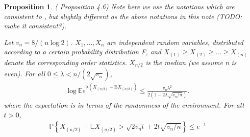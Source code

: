 \documentclass{article}
\theoremstyle{plain}
\newtheorem{prop}{Proposition}
\begin{document}
\begin{prop}
\label{prop 4.6}
(\cite{boucheron2012} Proposition 4.6) Note here we use the notations which are consistent to \cite{boucheron2012}, but slightly different as the above notations in this note (TODO: make it consistent?). 

Let $v_{n}=8 /(n \log 2)$. $X_1, ..., X_n$ are independent random variables, distributed according to a certain probability distribution F, and $X_{(1)} \geq X_{(2)} \geq ... \geq X_{(n)}$ denote the corresponding order statistics. $X_{n/2}$ is the median (we assume n is even). For all $0 \leq \lambda<n /\left(2 \sqrt{v_{n}}\right)$, 
\begin{align}
    \log \mathbb{E}e^{\lambda\left(X_{(n / 2)}-\mathrm{E} X_{(n / 2)}\right)} \leq \frac{v_{n} \lambda^{2}}{2\left(1-2 \lambda \sqrt{v_{n} / n}\right)}.
\end{align}
where the expectation is in terms of the randomness of the environment. For all $t > 0$,
\begin{align}
    \mathbb{P}\left\{X_{(n / 2)}-\mathbb{E} X_{(n / 2)}>\sqrt{2 v_{n} t}+2 t \sqrt{v_{n} / n}\right\} \leq e^{-t}
\end{align}
\end{prop}
\end{document}
